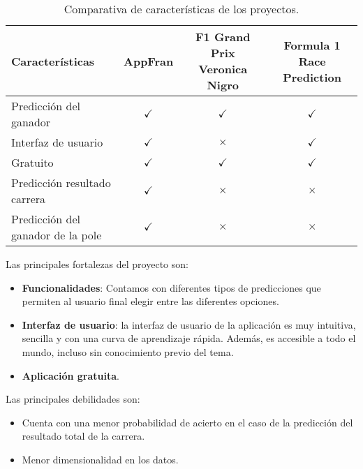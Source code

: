 \begin{table}[h!]
\centering
\begin{adjustbox}{width=\textwidth}
\begin{tabular}{lccc}
\toprule
Características                 & AppFran     & F1 Grand Prix 
Veronica Nigro & Formula 1 Race Prediction   \\
\midrule
Predicción del ganador               & \cellcolor{green!25} {$\checkmark$} & \cellcolor{green!25} {$\checkmark$}  & \cellcolor{green!25} {$\checkmark$}  \\
Interfaz de usuario             & \cellcolor{green!25} {$\checkmark$} & \cellcolor{red!25} {$\times$}  & \cellcolor{green!25} {$\checkmark$}  \\
Gratuito                        & \cellcolor{green!25} {$\checkmark$} & \cellcolor{green!25} {$\checkmark$}  & \cellcolor{green!25} {$\checkmark$}  \\
Predicción resultado carrera                        & \cellcolor{green!25} {$\checkmark$} & \cellcolor{red!25} {$\times$}  & \cellcolor{red!25} {$\times$}  \\
Predicción del ganador de la pole                        &
\cellcolor{green!25} {$\checkmark$} & \cellcolor{red!25} {$\times$}  & \cellcolor{red!25} {$\times$}  \\
\bottomrule
\end{tabular}
\end{adjustbox}
\caption{Comparativa de características de los proyectos.}
\label{comparativa-proyectos}
\end{table}

Las principales fortalezas del proyecto son:

\begin{itemize}
\tightlist
\item
  \textbf{Funcionalidades}: Contamos con diferentes tipos de predicciones que permiten al usuario final elegir entre las diferentes opciones. 
\item
  \textbf{Interfaz de usuario}: la interfaz de usuario de la aplicación es muy intuitiva, sencilla y con una curva de aprendizaje rápida. Además, es accesible a todo el mundo, incluso sin conocimiento previo del tema.
\item
  \textbf{Aplicación gratuita}.
\end{itemize}

Las principales debilidades son:

\begin{itemize}
\tightlist
\item
  Cuenta con una menor probabilidad de acierto en el caso de la predicción del resultado total de la carrera.
\item
  Menor dimensionalidad en los datos.
\end{itemize}
